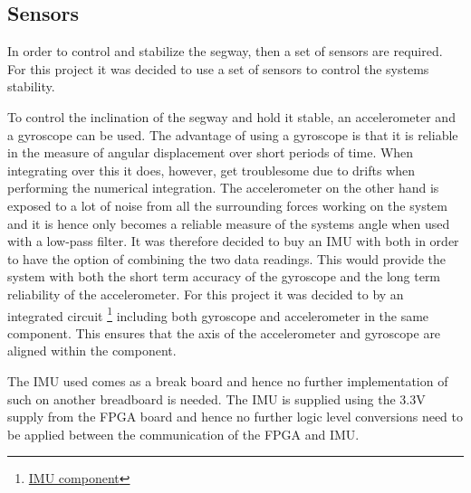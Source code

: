 
\subsection{Sensors}
In order to control and stabilize the segway, then a set of sensors are required.
For this project it was decided to use a set of sensors to control the systems stability.




To control the inclination of the segway and hold it stable, an accelerometer and a gyroscope can be used.
The advantage of using a gyroscope is that it is reliable in the measure of angular displacement over short periods of time.
When integrating over this it does, however, get troublesome due to drifts when performing the numerical integration.
The accelerometer on the other hand is exposed to a lot of noise from all the surrounding forces working on the system and it is hence only becomes a reliable measure of the systems angle when used with a low-pass filter.
It was therefore decided to buy an IMU with both in order to have the option of combining the two data readings.
This would provide the system with both the short term accuracy of the gyroscope and the long term reliability of the accelerometer.
For this project it was decided to by an integrated circuit
\footnote{ \href{https://www.sparkfun.com/products/13339}{IMU component}}
 including both gyroscope and accelerometer in the same component.
This ensures that the axis of the accelerometer and gyroscope are aligned within the component.

The IMU used comes as a break board and hence no further implementation of such on another breadboard is needed.
The IMU is supplied using the 3.3V supply from the FPGA board and hence no further logic level conversions need to be applied between the communication of the FPGA and IMU.


